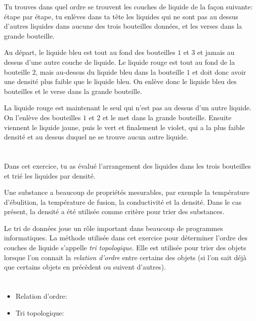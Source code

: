 {{{\centering%
\par}

Tu trouves dans quel ordre se trouvent les couches de liquide de la façon suivante: étape par étape, tu enlèves dans ta tête les liquides qui ne sont pas au dessus d’autres liquides dans aucune des trois bouteilles données, et les verses dans la grande bouteille.

Au départ, le liquide bleu est tout au fond des bouteilles $1$ et $3$ et jamais au dessus d’une autre couche de liquide. Le liquide rouge est tout au fond de la bouteille $2$, mais au-dessus du liquide bleu dans la bouteille $1$ et doit donc avoir une densité plus faible que le liquide bleu. On enlève donc le liquide bleu des bouteilles et le verse dans la grande bouteille.

La liquide rouge est maintenant le seul qui n’est pas au dessus d’un autre liquide. On l’enlève des bouteilles $1$ et $2$ et le met dans la grande bouteille. Ensuite viennent le liquide jaune, puis le vert et finalement le violet, qui a la plus faible densité et au dessus duquel ne se trouve aucun autre liquide.



\section*{\BrochureItsInformatics}
Dans cet exercice, tu as évalué l’arrangement des liquides dans les trois bouteilles et trié les liquides par densité.

Une substance a beaucoup de propriétés mesurables, par exemple la température d’ébulition, la température de fusion, la conductivité et la densité. Dans le cas présent, la densité a été utilisée comme critère pour trier des substances.

Le tri de données joue un rôle important dans beaucoup de programmes informatiques. La méthode utilisée dans cet exercice pour déterminer l’ordre des couches de liquide s’appelle \emph{tri topologique}. Elle est utilisée pour trier des objets lorsque l’on connait la \emph{relation d’ordre} entre certains des objets (si l’on sait déjà que certains objets en précèdent ou suivent d’autres).



\section*{\BrochureWebsitesAndKeywords}
{\raggedright
\begin{itemize}
  \item Relation d’ordre: \href{https://fr.wikipedia.org/wiki/Relation_d\%27ordre}{}
  \item Tri topologique: \href{https://fr.wikipedia.org/wiki/Tri_topologique}{}
\end{itemize}


}}}
